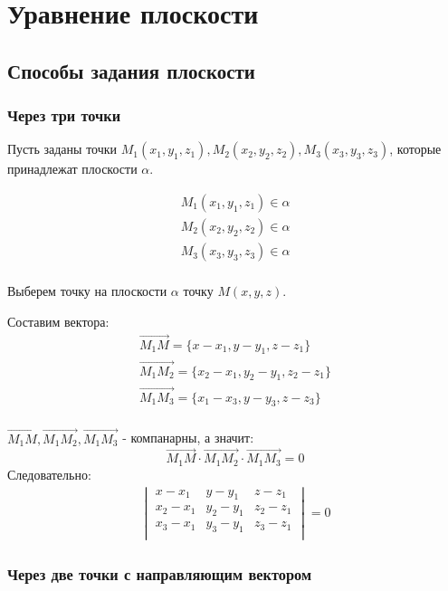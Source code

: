 \section{Уравнение плоскости}

\subsection{Способы задания плоскости}

\subsubsection{Через три точки}

Пусть заданы точки $M_1(x_1, y_1, z_1), M_2(x_2, y_2, z_2), M_3(x_3, y_3, z_3)$, которые принадлежат плоскости $\alpha$.

\begin{gather*}
  M_1(x_1, y_1, z_1) \in \alpha \\
  M_2(x_2, y_2, z_2) \in \alpha \\
  M_3(x_3, y_3, z_3) \in \alpha \\
\end{gather*}

Выберем точку на плоскости $\alpha$ точку $M(x, y, z)$.

Составим вектора:
\begin{gather*}
  \overrightarrow{M_1 M} = \{x - x_1, y - y_1, z - z_1\} \\
  \overrightarrow{M_1 M_2} = \{x_2 - x_1, y_2 - y_1, z_2 - z_1\} \\ 
  \overrightarrow{M_1 M_3} = \{x_1 - x_3, y - y_3, z - z_3\} \\
\end{gather*}

$\overrightarrow{M_1 M}, \overrightarrow{M_1 M_2}, \overrightarrow{M_1 M_3}$ - компанарны, а значит: \[
\overrightarrow{M_1 M} \cdot \overrightarrow{M_1 M_2} \cdot \overrightarrow{M_1 M_3} = 0
\] 
Следовательно:
\begin{gather*}
  \boxed{
  \begin{vmatrix}
    x - x_1 & y - y_1 & z - z_1 \\
    x_2 - x_1 & y_2 - y_1 & z_2 - z_1 \\
    x_3 - x_1 & y_3 - y_1 & z_3 - z_1 \\
  \end{vmatrix} = 0}
\end{gather*}

\subsubsection{Через две точки с направляющим вектором}

